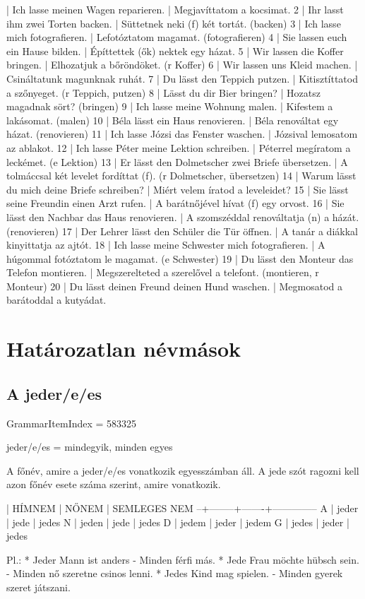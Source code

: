\documentclass{article}
\newenvironment{desc}{\verbatim}{\endverbatim}
\newenvironment{exmp}{\verbatim}{\endverbatim}
\begin{document}
\begin{exmp}
1 | Ich lasse meinen Wagen reparieren. | Megjavíttatom a kocsimat.
2 | Ihr lasst ihm zwei Torten backen. | Süttetnek neki (f) két tortát. (backen)
3 | Ich lasse mich fotografieren. | Lefotóztatom magamat. (fotografieren)
4 | Sie lassen euch ein Hause bilden. | Építtettek (ők) nektek egy házat.
5 | Wir lassen die Koffer bringen. | Elhozatjuk a bőröndöket. (r Koffer)
6 | Wir lassen uns Kleid machen. | Csináltatunk magunknak ruhát.
7 | Du lässt den Teppich putzen. | Kitisztíttatod a szőnyeget. (r Teppich, putzen)
8 | Lässt du dir Bier bringen? | Hozatsz magadnak sört? (bringen)
9 | Ich lasse meine Wohnung malen. | Kifestem a lakásomat. (malen)
10 | Béla lässt ein Haus renovieren. | Béla renováltat egy házat. (renovieren)
11 | Ich lasse Józsi das Fenster waschen. | Józsival lemosatom az ablakot.
12 | Ich lasse Péter meine Lektion schreiben. | Péterrel megíratom a leckémet. (e Lektion)
13 | Er lässt den Dolmetscher zwei Briefe übersetzen. | A tolmáccsal két levelet fordíttat (f). (r Dolmetscher, übersetzen)
14 | Warum lässt du mich deine Briefe schreiben? | Miért velem íratod a leveleidet?
15 | Sie lässt seine Freundin einen Arzt rufen. | A barátnőjével hívat (f) egy orvost.
16 | Sie lässt den Nachbar das Haus renovieren. | A szomszéddal renováltatja (n) a házát. (renovieren)
17 | Der Lehrer lässt den Schüler die Tür öffnen. | A tanár a diákkal kinyittatja az ajtót.
18 | Ich lasse meine Schwester mich fotografieren. | A húgommal fotóztatom le magamat. (e Schwester)
19 | Du lässt den Monteur das Telefon montieren. | Megszerelteted a szerelővel a telefont. (montieren, r Monteur)
20 | Du lässt deinen Freund deinen Hund waschen. | Megmosatod a barátoddal a kutyádat.
\end{exmp}

\section{Határozatlan névmások}

\subsection{A jeder/e/es}

GrammarItemIndex = 583325

\begin{desc}
jeder/e/es = mindegyik, minden egyes

A főnév, amire a jeder/e/es vonatkozik egyesszámban áll. A jede szót ragozni kell azon főnév esete száma szerint, amire vonatkozik.

  | HÍMNEM | NŐNEM | SEMLEGES NEM
--+--------+-------+--------------
A | jeder  | jede  | jedes
N | jeden  | jede  | jedes
D | jedem  | jeder | jedem
G | jedes  | jeder | jedes

Pl.: * Jeder Mann ist anders - Minden férfi más.
* Jede Frau möchte hübsch sein. - Minden nő szeretne csinos lenni.
* Jedes Kind mag spielen. - Minden gyerek szeret játszani.
\end{desc}
\end{document}
